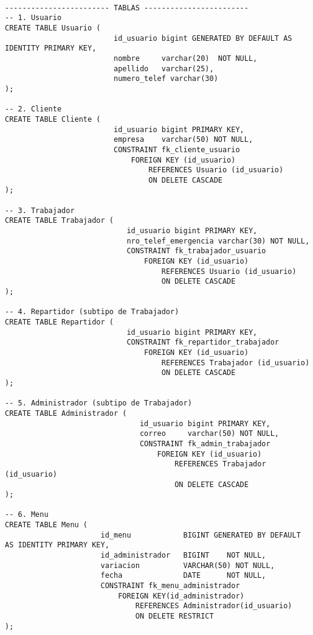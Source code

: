 \documentclass[12pt,a4paper]{article}
\begin{document}
\begin{lstlisting}

------------------------ TABLAS ------------------------
-- 1. Usuario
CREATE TABLE Usuario (
                         id_usuario bigint GENERATED BY DEFAULT AS IDENTITY PRIMARY KEY,
                         nombre     varchar(20)  NOT NULL,
                         apellido   varchar(25),
                         numero_telef varchar(30)
);

-- 2. Cliente
CREATE TABLE Cliente (
                         id_usuario bigint PRIMARY KEY,
                         empresa    varchar(50) NOT NULL,
                         CONSTRAINT fk_cliente_usuario
                             FOREIGN KEY (id_usuario)
                                 REFERENCES Usuario (id_usuario)
                                 ON DELETE CASCADE
);

-- 3. Trabajador
CREATE TABLE Trabajador (
                            id_usuario bigint PRIMARY KEY,
                            nro_telef_emergencia varchar(30) NOT NULL,
                            CONSTRAINT fk_trabajador_usuario
                                FOREIGN KEY (id_usuario)
                                    REFERENCES Usuario (id_usuario)
                                    ON DELETE CASCADE
);

-- 4. Repartidor (subtipo de Trabajador)
CREATE TABLE Repartidor (
                            id_usuario bigint PRIMARY KEY,
                            CONSTRAINT fk_repartidor_trabajador
                                FOREIGN KEY (id_usuario)
                                    REFERENCES Trabajador (id_usuario)
                                    ON DELETE CASCADE
);

-- 5. Administrador (subtipo de Trabajador)
CREATE TABLE Administrador (
                               id_usuario bigint PRIMARY KEY,
                               correo     varchar(50) NOT NULL,
                               CONSTRAINT fk_admin_trabajador
                                   FOREIGN KEY (id_usuario)
                                       REFERENCES Trabajador (id_usuario)
                                       ON DELETE CASCADE
);

-- 6. Menu
CREATE TABLE Menu (
                      id_menu            BIGINT GENERATED BY DEFAULT AS IDENTITY PRIMARY KEY,
                      id_administrador   BIGINT    NOT NULL,
                      variacion          VARCHAR(50) NOT NULL,
                      fecha              DATE      NOT NULL,
                      CONSTRAINT fk_menu_administrador
                          FOREIGN KEY(id_administrador)
                              REFERENCES Administrador(id_usuario)
                              ON DELETE RESTRICT
);


\end{lstlisting}
\end{document}
